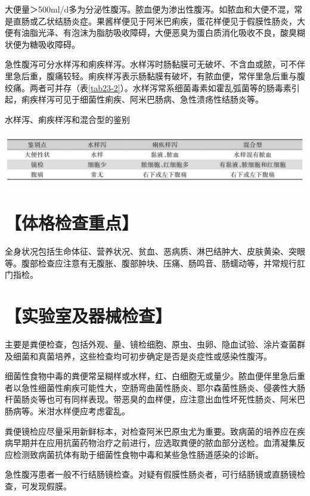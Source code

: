 大便量＞500ml/d多为分泌性腹泻。脓血便为渗出性腹泻。如脓血和大便不混，常是直肠或乙状结肠炎症。果酱样便见于阿米巴痢疾，蛋花样便见于假膜性肠炎，大便有油脂光泽、有泡沫为脂肪吸收障碍，大便恶臭为蛋白质消化吸收不良，酸臭糊状便为糖吸收障碍。

急性腹泻可分水样泻和痢疾样泻。水样泻时肠黏膜可无破坏、不含血或脓，可不伴里急后重，腹痛较轻。痢疾样泻表示肠黏膜有破坏，有脓血便，常伴里急后重与腹绞痛。两者可并存（表\ref{tab23-2}）。水样泻常系细菌毒素如霍乱弧菌等的肠毒素引起，痢疾样泻可见于细菌性痢疾、阿米巴肠病、急性溃疡性结肠炎等。

\begin{table}[htbp]
\centering
\caption{水样泻、痢疾样泻和混合型的鉴别}
\label{tab23-2}
\includegraphics[width=5.91667in,height=0.89583in]{./images/Image00125.jpg}
\end{table}

\section{【体格检查重点】}

全身状况包括生命体征、营养状况、贫血、恶病质、淋巴结肿大、皮肤黄染、突眼等。腹部检查应注意有无腹胀、腹部肿块、压痛、肠鸣音、肠蠕动等，并常规行肛门指检。

\section{【实验室及器械检查】}

主要是粪便检查，包括外观、量、镜检细胞、原虫、虫卵、隐血试验、涂片查菌群及细菌和真菌培养，这些检查均可初步确定是否是炎症性或感染性腹泻。

细菌性食物中毒的粪便常呈糊样或水样，红、白细胞无或量少。脓血便伴里急后重者以急性细菌性痢疾可能性大，空肠弯曲菌性肠炎、耶尔森菌性肠炎、侵袭性大肠杆菌肠炎等也可有同样表现。带恶臭的血样便，应注意出血性坏死性肠炎、阿米巴肠病等。米泔水样便应考虑霍乱。

粪便镜检应尽量采用新鲜标本，对检查阿米巴原虫尤为重要。致病菌的培养应在疾病早期并在应用抗菌药物治疗之前进行，应选取粪便的脓血部分送检。血清凝集反应检测致病菌抗体有助于细菌性食物中毒和某些急性肠道感染的诊断。

急性腹泻患者一般不行结肠镜检查。对疑有假膜性肠炎者，可行结肠镜或直肠镜检查，可发现假膜。

